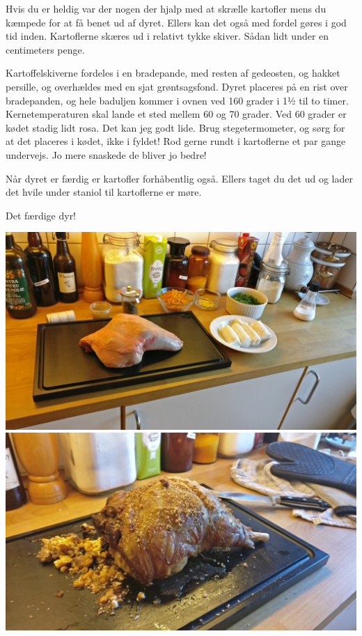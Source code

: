 \documentclass[
]{book}
\begin{document}
Hvis du er heldig var der nogen der hjalp med at skrælle kartofler mens du kæmpede for at få benet ud af dyret. Ellers kan det også med fordel gøres i god tid inden. Kartoflerne skæres ud i relativt tykke skiver. Sådan lidt under en centimeters penge.

Kartoffelskiverne fordeles i en bradepande, med resten af gedeosten, og hakket persille, og overhældes med en sjat grøntsagsfond. Dyret placeres på en rist over bradepanden, og hele baduljen kommer i ovnen ved 160 grader i 1½ til to timer. Kernetemperaturen skal lande et sted mellem 60 og 70 grader. Ved 60 grader er kødet stadig lidt rosa. Det kan jeg godt lide. Brug stegetermometer, og sørg for at det placeres i kødet, ikke i fyldet! Rod gerne rundt i kartoflerne et par gange undervejs. Jo mere snaskede de bliver jo bedre!

Når dyret er færdig er kartofler forhåbentlig også. Ellers taget du det ud og lader det hvile under staniol til kartoflerne er møre.

Det færdige dyr!

\includegraphics{images/lam1-scaled.jpg}
\includegraphics{images/lam2-scaled.jpg}
\end{document}
